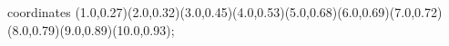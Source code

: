 					coordinates { (1.0,0.27)(2.0,0.32)(3.0,0.45)(4.0,0.53)(5.0,0.68)(6.0,0.69)(7.0,0.72)(8.0,0.79)(9.0,0.89)(10.0,0.93)};